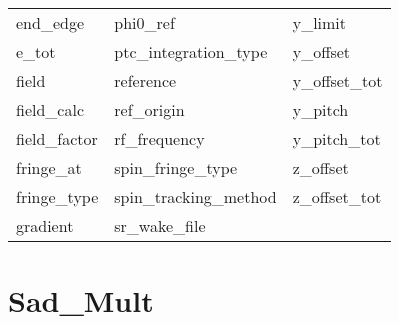 \begin{tabular}{lll}
end_edge                    & phi0_ref                    & y_limit                     \\
e_tot                       & ptc_integration_type        & y_offset                    \\
field                       & reference                   & y_offset_tot                \\
field_calc                  & ref_origin                  & y_pitch                     \\
field_factor                & rf_frequency                & y_pitch_tot                 \\
fringe_at                   & spin_fringe_type            & z_offset                    \\
fringe_type                 & spin_tracking_method        & z_offset_tot                \\
gradient                    & sr_wake_file                &                             \\
 \bottomrule
 \end{tabular}
 \vfill
 
 \section{Sad_Mult}
 \label{s:list.sad.mult}
 
